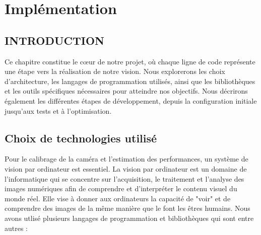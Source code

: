 \chapter{Implémentation}
\begin{spacing}{1.2}
\minitoc
\thispagestyle{MyStyle}
\end{spacing}
\newpage

\section{INTRODUCTION}
Ce chapitre constitue le cœur de notre projet, où chaque ligne de code représente une étape vers la réalisation de notre vision. Nous explorerons les choix d'architecture, les langages de programmation utilisés, ainsi que les bibliothèques et les outils spécifiques nécessaires pour atteindre nos objectifs. Nous décrirons également les différentes étapes de développement, depuis la configuration initiale jusqu'aux tests et à l'optimisation.
  
 
 \section{Choix de technologies utilisé}
 
 Pour le calibrage de la caméra et l'estimation des performances, un système de vision par ordinateur est essentiel. La vision par ordinateur est un domaine de l'informatique qui se concentre sur l'acquisition, le traitement et l'analyse des images numériques afin de comprendre et d'interpréter le contenu visuel du monde réel. Elle vise à donner aux ordinateurs la capacité de "voir" et de comprendre des images de la même manière que le font les êtres humains.
 Nous avons utlisé plusieurs langages de programmation et bibliothèques qui sont entre autres : 
 
